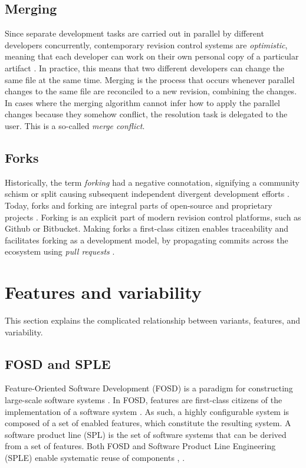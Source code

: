 \subsection{Merging}
Since separate development tasks are carried out in parallel by different developers concurrently, contemporary revision control systems are \textit{optimistic}, meaning that each developer can work on their own personal copy of a particular artifact \cite{mens2002}. In practice, this means that two different developers can change the same file at the same time. Merging is the process that occurs whenever parallel changes to the same file are reconciled to a new revision, combining the changes. In cases where the merging algorithm cannot infer how to apply the parallel changes because they somehow conflict, the resolution task is delegated to the user. This is a so-called \textit{merge conflict}.




\subsection{Forks}
Historically, the term \textit{forking} had a negative connotation, signifying a community schism or split causing subsequent independent divergent development efforts \cite{stanciulescu2015}. Today, forks and forking are integral parts of open-source and proprietary projects \cite{stanciulescu2015}. %
Forking is an explicit part of modern revision control platforms, such as Github or Bitbucket. Making forks a first-class citizen enables traceability and facilitates forking as a development model, by propagating commits across the ecosystem using \textit{pull requests} \cite{stanciulescu2015}.

\section{Features and variability}
This section explains the complicated relationship between variants, features, and variability.

\subsection{FOSD and SPLE}
Feature-Oriented Software Development (FOSD) is a paradigm for constructing large-scale software systems \cite{apel2009overview}. In FOSD, features are first-class citizens of the implementation of a software system \cite{apel2009overview}. As such, a highly configurable system is composed of a set of enabled features, which constitute the resulting system. A software product line (SPL) is the set of software systems that can be derived from a set of features. Both FOSD and Software Product Line Engineering (SPLE) enable systematic reuse of components \cite{apel2009overview}, \cite{antkiewicz2014flexible}.

